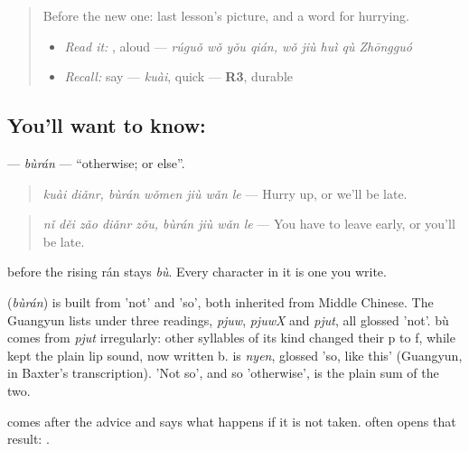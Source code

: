 \label{lesson:ZH-C289-buran}



\begin{quote}
Before the new one: last lesson's picture, and a word for hurrying.

\begin{itemize}
\raggedright
  \item \emph{Read it:}  , aloud — \emph{rúguǒ wǒ yǒu qián, wǒ jiù huì qù Zhōngguó}
  \item \emph{Recall:} say  — \emph{kuài}, quick — \textbf{R3}, durable
\end{itemize}
\end{quote}

\subsection*{You'll want to know: }
\textbf{} — \emph{bùrán} — \textquotedblleft{}otherwise; or else\textquotedblright{}.

\begin{quote}
\textbf{ } \emph{kuài diǎnr, bùrán wǒmen jiù wǎn le} — Hurry up, or we'll be late.
\end{quote}

\begin{quote}
\textbf{ } \emph{nǐ děi zǎo diǎnr zǒu, bùrán jiù wǎn le} — You have to leave early, or you'll be late.
\end{quote}

 before the rising rán stays \emph{bù}. Every character in it is one you write.

\begin{cousinweb}
\textbf{} (\emph{bùrán}) is built from  'not' and  'so', both inherited from Middle Chinese. The Guangyun lists  under three readings, \emph{pjuw}, \emph{pjuwX} and \emph{pjut}, all glossed 'not'. bù comes from \emph{pjut} irregularly: other syllables of its kind changed their p to f, while  kept the plain lip sound, now written b.  is \emph{nyen}, glossed 'so, like this' (Guangyun, in Baxter's transcription). 'Not so', and so 'otherwise', is the plain sum of the two.
\end{cousinweb}

\begin{grammarlens}[title={What you've built}]
 comes after the advice and says what happens if it is not taken.  often opens that result: .
\end{grammarlens}

